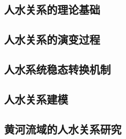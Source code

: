 \subsection{人水关系的理论基础}\label{ch1:sec:theories}


\subsection{人水关系的演变过程}\label{ch1:sec:process}


\subsection{人水系统稳态转换机制}\label{ch1:sec:mechanism}


\subsection{人水关系建模}\label{ch1:sec:model}


\subsection{黄河流域的人水关系研究}\label{ch1:sec:yellow_river}
